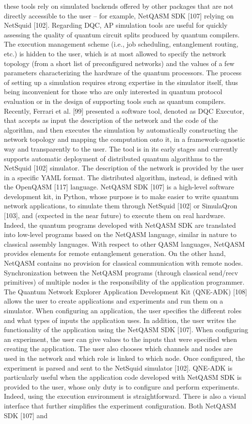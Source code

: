these tools rely on simulated backends offered by other packages that are not directly accessible to the user – for example, NetQASM SDK [107] relying on NetSquid [102]. Regarding DQC, AP simulation tools are useful for quickly assessing the quality of quantum circuit splits produced by quantum compilers. The execution management scheme (i.e., job scheduling, entanglement routing, etc.) is hidden to the user, which is at most allowed to specify the network topology (from a short list of preconfigured networks) and the values of a few parameters characterizing the hardware of the quantum processors. The process of setting up a simulation requires strong expertise in the simulator itself, thus being inconvenient for those who are only interested in quantum protocol evaluation or in the design of supporting tools such as quantum compilers. Recently, Ferrari et al. [99] presented a software tool, denoted as DQC Executor, that accepts as input the description of the network and the code of the algorithm, and then executes the simulation by automatically constructing the network topology and mapping the computation onto it, in a framework-agnostic way and transparently to the user. The tool is in its early stages and currently supports automatic deployment of distributed quantum algorithms to the NetSquid [102] simulator. The description of the network is provided by the user in a specific YAML format. The distributed algorithm, instead, is defined with the OpenQASM [117] language. NetQASM SDK [107] is a high-level software development kit, in Python, whose purpose is to make easier to write quantum network applications, to simulate them through NetSquid [102] or SimulaQron [103], and (expected in the near future) to execute them on real hardware. Indeed, the quantum programs developed with NetQASM SDK are translated into low-level programs based on the NetQASM language, similar in nature to classical assembly languages. With respect to other QASM languages, NetQASM provides elements for remote entanglement generation. On the other hand, NetQASM contains no provision for classical communication with remote nodes. Synchronization between the NetQASM programs (through classical send/recv primitives) of multiple nodes is the responsibility of the application programmer. The Quantum Network Explorer Application Development Kit (QNE-ADK) [108] allows the user to create applications and experiments and run them on a simulator. When configuring an application, the user specifies the different roles and what types of inputs the application uses. In addition, the user writes the functionality of the application using the NetQASM SDK [107]. When configuring an experiment, the user can give values to the inputs that were specified when creating the application. The user also chooses which channels and nodes are used in the network and which role is linked to which node. Once configured, the experiment is parsed and sent to the NetSquid simulator [102]. QNE-ADK is particularly useful when the application code developed with NetQASM SDK is provided to the user, whose only duty is to configure and perform experiments. Indeed, using the execution environment is straightforward. There is also a visual interface that further simplifies the experiment configuration. Both NetQASM SDK [107] and 
